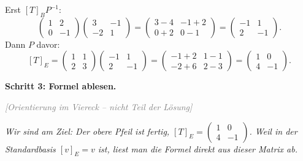\documentclass[a4paper,12pt]{article}
\newcommand{\orient}{\textcolor{gray}{\small\textit{[Orientierung im Viereck -- nicht Teil der L\"osung]}}}
\begin{document}
Erst $[T]_B P^{-1}$:
\[
\begin{pmatrix} 1 & 2 \\ 0 & -1 \end{pmatrix}\begin{pmatrix} 3 & -1 \\ -2 & 1 \end{pmatrix}
= \begin{pmatrix} 3 - 4 & -1 + 2 \\ 0 + 2 & 0 - 1 \end{pmatrix}
= \begin{pmatrix} -1 & 1 \\ 2 & -1 \end{pmatrix}.
\]
Dann $P$ davor:
\[
[T]_E = \begin{pmatrix} 1 & 1 \\ 2 & 3 \end{pmatrix}\begin{pmatrix} -1 & 1 \\ 2 & -1 \end{pmatrix}
= \begin{pmatrix} -1 + 2 & 1 - 1 \\ -2 + 6 & 2 - 3 \end{pmatrix}
= \begin{pmatrix} 1 & 0 \\ 4 & -1 \end{pmatrix}.
\]

\textbf{Schritt 3: Formel ablesen.}

\orient
\begin{center}
\end{center}
{\small\itshape\color{gray} Wir sind am Ziel: Der obere Pfeil ist fertig, $[T]_E = \left(\begin{smallmatrix}1&0\\4&-1\end{smallmatrix}\right)$. Weil in der Standardbasis $[v]_E = v$ ist, liest man die Formel direkt aus dieser Matrix ab.}
\end{document}
